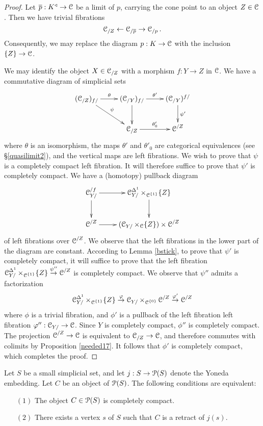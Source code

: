\begin{proof}
Let $\overline{p}: K^{\triangleleft} \rightarrow \operatorname{\mathcal{C}}$ be a limit of $p$, carrying the cone point to an object $Z \in \operatorname{\mathcal{C}}$. Then we have trivial fibrations
$$ \operatorname{\mathcal{C}}_{/Z} \leftarrow \operatorname{\mathcal{C}}_{/\overline{p} } \rightarrow \operatorname{\mathcal{C}}_{/p}.$$
Consequently, we may replace the diagram $p: K \rightarrow \operatorname{\mathcal{C}}$ with the inclusion
$\{Z\} \rightarrow \operatorname{\mathcal{C}}$.

We may identify the object $X \in \operatorname{\mathcal{C}}_{/Z}$ with a morphism $f: Y \rightarrow Z$ in $\operatorname{\mathcal{C}}$.
We have a commutative diagram of simplicial sets
$$ \xymatrix{ (\calC_{/Z})_{f/} \ar[dr]^{\psi} \ar[r]^{\theta} & (\calC_{/Y})_{f/} \ar[d] \ar[r]^{\theta'} & (\calC_{/Y})^{f/} \ar[d]^{\psi'} \\
& \calC_{/Z} \ar[r]^{\theta'_0} & \calC^{/Z} }$$
where $\theta$ is an isomorphism, the maps $\theta'$ and $\theta'_0$ are categorical equivalences (see \S \ref{quasilimit2}), and the vertical maps are left fibrations. We wish to prove
that $\psi$ is a completely compact left fibration. It will therefore suffice to prove that
$\psi'$ is completely compact. We have a (homotopy) pullback diagram
$$ \xymatrix{ \calC_{Y/}^{/f} \ar[r] \ar[d] & \calC_{Y/}^{\Delta^1} \times_{\calC^{\{1\}}} \{Z\} \ar[d] \\
\calC^{/Z} \ar[r] & (\calC_{Y/} \times_{\calC} \{Z\}) \times \calC^{/Z} }$$
of left fibrations over $\operatorname{\mathcal{C}}^{/Z}$. We observe that the left fibrations in the lower part of the diagram are constant. According to Lemma \ref{bstick}, to prove that $\psi'$ is completely compact, it will suffice to prove that the left fibration $\operatorname{\mathcal{C}}_{Y/}^{\Delta^1} \times_{ \operatorname{\mathcal{C}}^{ \{1\} } } \{Z\} \stackrel{\psi''}{\rightarrow} \operatorname{\mathcal{C}}^{/Z}$ is completely compact. We observe that $\psi''$ admits a factorization
$$ \operatorname{\mathcal{C}}_{Y/}^{\Delta^1} \times_{ \operatorname{\mathcal{C}}^{ \{1\} }} \{Z\} \stackrel{\varphi}{\rightarrow}
\operatorname{\mathcal{C}}_{Y/} \times_{ \operatorname{\mathcal{C}}^{ \{0\} } } \operatorname{\mathcal{C}}^{/Z} \stackrel{\varphi'}{\rightarrow} \operatorname{\mathcal{C}}^{/Z}$$
where $\phi$ is a trivial fibration, and $\phi'$ is a pullback of the left fibration
left fibration $\varphi'': \operatorname{\mathcal{C}}_{Y/} \rightarrow \operatorname{\mathcal{C}}$. Since $Y$ is completely compact, $\phi''$ is completely compact. The projection $\operatorname{\mathcal{C}}^{/Z} \rightarrow \operatorname{\mathcal{C}}$ is equivalent to
$\operatorname{\mathcal{C}}_{/Z} \rightarrow \operatorname{\mathcal{C}}$, and therefore commutes with colimits by Proposition \ref{needed17}.
It follows that $\phi'$ is completely compact, which completes the proof.
\end{proof}

\begin{proposition}\label{dda}
Let $S$ be a small simplicial set, and let $j: S \rightarrow \operatorname{\mathcal{P}}(S)$ denote the Yoneda embedding.
Let $C$ be an object of $\operatorname{\mathcal{P}}(S)$. The following conditions are equivalent:
\begin{itemize}
\item[$(1)$] The object $C \in \operatorname{\mathcal{P}}(S)$ is completely compact.
\item[$(2)$] There exists a vertex $s$ of $S$ such that $C$ is a retract of $j(s)$.
\end{itemize}
\end{proposition}

